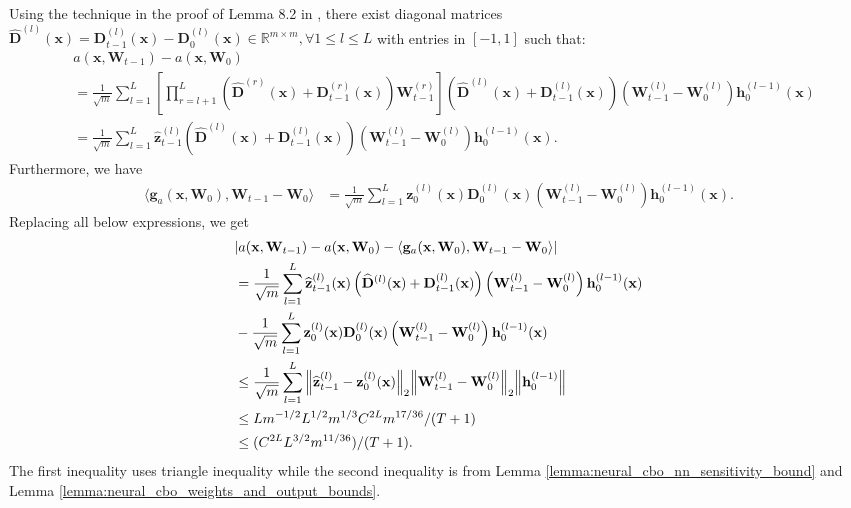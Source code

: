 \noindent Using the technique in the proof of Lemma 8.2 in \citep{allen2019convergence},  there exist diagonal matrices $\widehat{\mathbf{D}}^{(l)} (\mathbf{x}) = \mathbf{D}_{t-1}^{(l)}(\mathbf{x}) - \mathbf{D}_{0}^{(l)}(\mathbf{x})   \in \mathbb{R}^{m \times m}, \forall 1\le l \le L$ with entries in
$[-1,1]$ such that:
\begin{align*}
    &  a(\mathbf{x}, \mathbf{W}_{t-1}) - a(\mathbf{x}, \mathbf{W}_{0}) 
    \\
    & = \frac{1}{\sqrt{m}} \sum_{l=1}^L \left [ \prod_{r = l+1}^L \left(\widehat{\mathbf{D}}^{(r)} (\mathbf{x}) + \mathbf{D}_{t-1}^{(r)} (\mathbf{x}) \right) \mathbf{W}_{t-1}^{(r)} \right] \left (\widehat{\mathbf{D}}^{(l)} (\mathbf{x}) + \mathbf{D}_{t-1}^{(l)} (\mathbf{x}) \right) (\mathbf{W}_{t-1}^{(l)} - \mathbf{W}_{0}^{(l)}) \mathbf{h}_{0}^{(l-1)} (\mathbf{x})
    \\
    & = \frac{1}{\sqrt{m}} \sum_{l=1}^L  \widehat{\mathbf{z}}_{t-1}^{(l)} \left (\widehat{\mathbf{D}}^{(l)} (\mathbf{x}) + \mathbf{D}_{t-1}^{(l)} (\mathbf{x}) \right) \left( \mathbf{W}_{t-1}^{(l)} - \mathbf{W}_{0}^{(l)} \right) \mathbf{h}_{0}^{(l-1)} (\mathbf{x}).
\end{align*}
Furthermore, we have 
\begin{align*}
    \langle \mathbf{g}_{a}(\mathbf{x}, \mathbf{W}_0), \mathbf{W}_{t-1} - \mathbf{W}_0 \rangle &= \frac{1}{\sqrt{m}}\sum_{l=1}^L  \mathbf{z}_0^{(l)}(\mathbf{x}) \mathbf{D}_0^{(l)}(\mathbf{x}) \left(\mathbf{W}_{t-1}^{(l)} -  \mathbf{W}_0^{(l)}\right) \mathbf{h}_0^{(l-1)}(\mathbf{x}).
\end{align*}
Replacing all below expressions, we get
\begin{align*}
    & \lvert a(\mathbf{x}, \mathbf{W}_{t-1}) -  a(\mathbf{x}, \mathbf{W}_{0}) - \langle \mathbf{g}_{a}(\mathbf{x}, \mathbf{W}_0), \mathbf{W}_{t-1} - \mathbf{W}_0 \rangle \rvert 
    \\
    & = \frac{1}{\sqrt{m}} \sum_{l=1}^L  \widehat{\mathbf{z}}_{t-1}^{(l)} (\mathbf{x}) \left (\widehat{\mathbf{D}}^{(l)} (\mathbf{x}) + \mathbf{D}_{t-1}^{(l)} (\mathbf{x}) \right) \left( \mathbf{W}_{t-1}^{(l)} - \mathbf{W}_{0}^{(l)} \right) \mathbf{h}_{0}^{(l-1)} (\mathbf{x})
    \\ 
    & - \frac{1}{\sqrt{m}}\sum_{l=1}^L  \mathbf{z}_0^{(l)}(\mathbf{x}) \mathbf{D}_0^{(l)}(\mathbf{x}) \left(\mathbf{W}_{t-1}^{(l)} -  \mathbf{W}_0^{(l)}\right) \mathbf{h}_0^{(l-1)}(\mathbf{x})
    \\
    & \le \frac{1}{\sqrt{m}}\sum_{l=1}^L \norm{\widehat{\mathbf{z}}_{t-1}^{(l)} - \mathbf{z}_0^{(l)}(\mathbf{x})}_2  \norm{\mathbf{W}_{t-1}^{(l)} -  \mathbf{W}_0^{(l)}}_2 \norm{\mathbf{h}_{0}^{(l-1)}}
    \\
    & \le L m^{-1/2} L^{1/2} m^{1/3} C^{2L} m^{17/36} / (T+1)
    \\ 
    & \le (C^{2L} L^{3/2} m^{11/36}) / (T+1).
\end{align*} 
The first inequality uses triangle inequality while the second inequality is from Lemma \ref{lemma:neural_cbo_nn_sensitivity_bound} and Lemma  \ref{lemma:neural_cbo_weights_and_output_bounds}.
